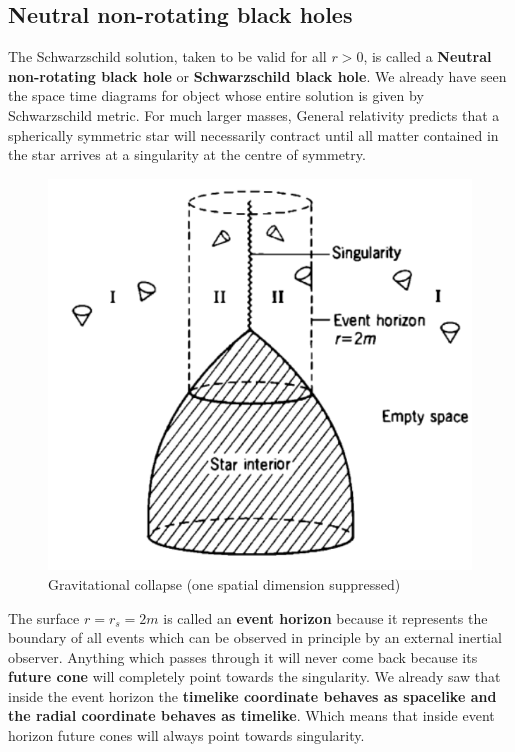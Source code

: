 \documentclass[12pt,a4paper]{article}
\numberwithin{table}{section}
\numberwithin{figure}{section}
\numberwithin{equation}{section}
\theoremstyle{remark}
\theoremstyle{definition}
\begin{document}
\subsection{Neutral non-rotating black holes}
The Schwarzschild solution, taken to be valid for all $r>0$, is called a \textbf{Neutral non-rotating black hole} or \textbf{Schwarzschild black hole}.  We already have seen the space time diagrams for object whose entire solution is given by Schwarzschild metric. For much larger masses, General relativity predicts that a  spherically symmetric star will necessarily contract until all matter contained in the star arrives at a singularity at the centre of symmetry. 
\begin{figure}[H]
    \centering
  \includegraphics[scale=0.6]{st4}
  \caption{Gravitational collapse (one spatial dimension suppressed)}
  \label{fig:deviation}
\end{figure}
The surface $r=r_s=2m$ is called an \textbf{event horizon} because it represents the boundary of all events which can be observed in principle by an external inertial observer. Anything which passes through it will never come back because its \textbf{future cone} will completely point towards the singularity. We already saw that inside the event horizon the \textbf{timelike coordinate behaves as spacelike and the radial coordinate behaves as timelike}. Which means that inside event horizon future cones will always point towards singularity.
\end{document}
